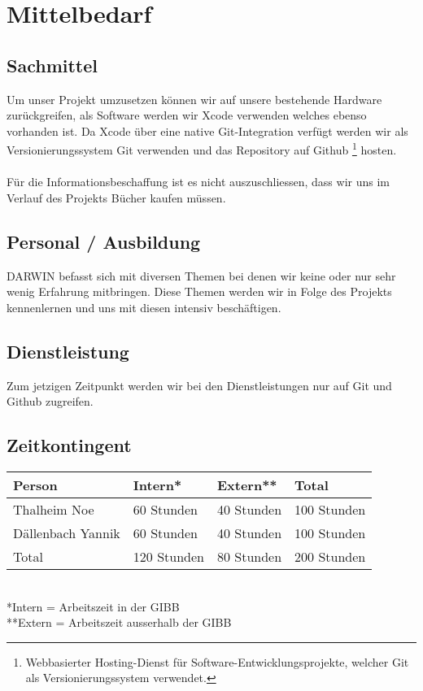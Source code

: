 \section{Mittelbedarf}
	
\subsection{Sachmittel}
	
Um unser Projekt umzusetzen können wir auf unsere bestehende Hardware zurückgreifen, als Software werden wir Xcode verwenden welches ebenso vorhanden ist. 
Da Xcode über eine native Git-Integration verfügt werden wir als Versionierungssystem Git verwenden und das Repository auf Github
\footnote{Webbasierter Hosting-Dienst für Software-Entwicklungsprojekte, welcher Git als Versionierungssystem verwendet.} hosten. 
\\ \\
Für die Informationsbeschaffung ist es nicht auszuschliessen, dass wir uns im Verlauf des Projekts Bücher kaufen müssen. 
	
\subsection{Personal / Ausbildung}
	
DARWIN befasst sich mit diversen Themen bei denen wir keine oder nur sehr wenig Erfahrung mitbringen. Diese Themen werden wir in Folge des Projekts kennenlernen und uns mit diesen intensiv beschäftigen. 
	
\subsection{Dienstleistung}
Zum jetzigen Zeitpunkt werden wir bei den Dienstleistungen nur auf Git und Github zugreifen.

\subsection{Zeitkontingent}
\begin{tabularx}{\textwidth}{| X | X | X | X |}
\hline
\rowcolor[gray]{0.9} Person & Intern* & Extern** & Total\\
\hline
Thalheim Noe & 60 Stunden & 40 Stunden & 100 Stunden\\
\hline
Dällenbach Yannik & 60 Stunden & 40 Stunden & 100 Stunden\\
\hline
\rowcolor[gray]{0.9} Total & 120 Stunden & 80 Stunden & 200 Stunden\\
\hline
\end{tabularx}
\\
*Intern = Arbeitszeit in der GIBB\\
**Extern = Arbeitszeit ausserhalb der GIBB
